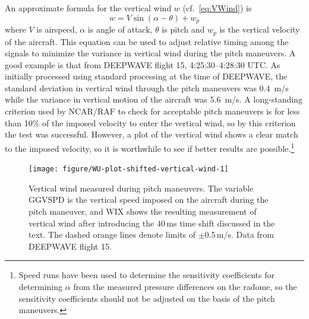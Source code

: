 \documentclass[12pt,twoside,english]{article}\usepackage[]{graphicx}\usepackage[]{color}
\newenvironment{knitrout}{}{} %
\let\OrgIndex\index
\renewcommand*{\index}[1]{\OrgIndex{#1}}
\begin{document}
An approximate formula for the vertical wind $w$ (cf.~\eqref{eq:VWind}) is
\begin{equation}
w=V\sin(\alpha-\theta)+w_{p}\label{eq:Weq} 
\end{equation}
where $V$ is airspeed, $\alpha$ is angle of attack, $\theta$ is pitch and $w_{p}$ is the vertical velocity of the aircraft. This equation can be used to adjust relative timing among the signals to minimize the variance in vertical wind during the pitch maneuvers. A good example is that from DEEPWAVE flight 15, 4:25:30--4:28:30 UTC. As initially processed using standard processing at the time of DEEPWAVE, the standard deviation in vertical wind through the pitch maneuvers was 0.4~m/s while the variance in vertical motion of the aircraft was 5.6~m/s. A long-standing criterion used by NCAR/RAF to check for acceptable pitch maneuvers is for less than 10\% of the imposed velocity to enter the vertical wind, so by this criterion the test was successful. However, a plot of the vertical wind shows a clear match to the imposed velocity, so it is worthwhile to see if better results are possible.\footnote{Speed runs have been used to determine the sensitivity coefficients for determining $\alpha$ from the measured pressure differences on the radome, so the sensitivity coefficients should not be adjusted on the basis of the pitch maneuvers.}

\begin{knitrout}\footnotesize
{}\color{fgcolor}\begin{figure}

{\centering \texttt{[image: figure/WU-plot-shifted-vertical-wind-1]} 

}

\caption[Vertical wind measured during pitch maneuvers]{Vertical wind measured during pitch maneuvers. The variable GGVSPD is the vertical speed imposed on the aircraft during the pitch maneuver, and WIX shows the resulting measurement of vertical wind after introducing the 40\,ms time shift discussed in the text. The dashed orange lines denote limits of $\pm$0.5\,m/s. Data from DEEPWAVE flight 15.}\label{fig:plot-shifted-vertical-wind}
\end{figure}


\end{knitrout}
\end{document}
